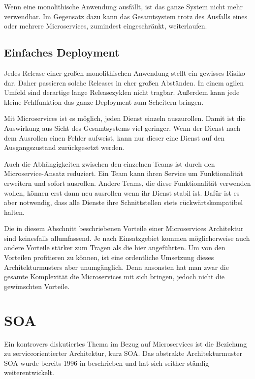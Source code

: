 Wenn eine monolithische Anwendung ausfällt, ist das ganze System nicht mehr verwendbar. Im Gegensatz dazu kann das Gesamtsystem trotz des Ausfalls eines oder mehrere Microservices, zumindest eingeschränkt, weiterlaufen.

\subsection{Einfaches Deployment}

Jedes Release einer großen monolithischen Anwendung stellt ein gewisses Risiko dar. Daher passieren solche Releases in eher großen Abständen. In einem agilen Umfeld sind derartige lange Releasezyklen nicht tragbar. Außerdem kann jede kleine Fehlfunktion das ganze Deployment zum Scheitern bringen.

Mit Microservices ist es möglich, jeden Dienst einzeln auszurollen. Damit ist die Auswirkung aus Sicht des Gesamtsystems viel geringer. Wenn der Dienst nach dem Ausrollen einen Fehler aufweist, kann nur dieser eine Dienst auf den Ausgangszustand zurückgesetzt werden.

Auch die Abhängigkeiten zwischen den einzelnen Teams ist durch den Microservice-Ansatz reduziert. Ein Team kann ihren Service um Funktionalität erweitern und sofort ausrollen. Andere Teams, die diese Funktionalität verwenden wollen, können erst dann neu ausrollen wenn ihr Dienst stabil ist. Dafür ist es aber notwendig, dass alle Dienste ihre Schnittstellen stets rückwärtskompatibel halten.

Die in diesem Abschnitt beschriebenen Vorteile einer Microservices Architektur sind keinesfalls allumfassend. Je nach Einsatzgebiet kommen möglicherweise auch andere Vorteile stärker zum Tragen als die hier angeführten. Um von den Vorteilen profitieren zu können, ist eine ordentliche Umsetzung dieses Architekturmusters aber unumgänglich. Denn ansonsten hat man zwar die gesamte Komplexität die Microservices mit sich bringen, jedoch nicht die gewünschten Vorteile.

\section{SOA}

Ein kontrovers diskutiertes Thema im Bezug auf Microservices ist die Beziehung zu serviceorientierter Architektur, kurz SOA. Das abstrakte Architekturmuster SOA wurde bereits 1996 in \cite{schulte1996service} beschrieben und hat sich seither ständig weiterentwickelt.

